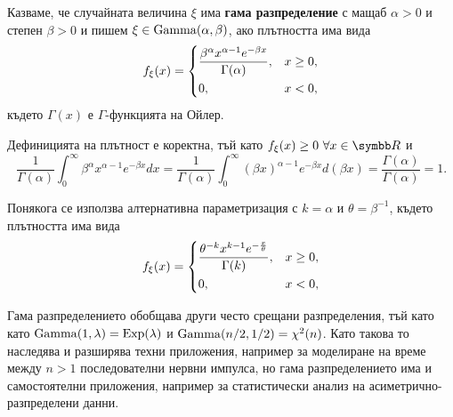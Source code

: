 \documentclass[numbers=endperiod, bibliography=totocnumbered]{scrartcl}
\begin{document}
\begin{definition}
  Казваме, че случайната величина \( \xi \) има \textbf{гама разпределение} с мащаб \( \alpha > 0 \) и степен \( \beta > 0 \) и пишем \( \xi \in \operatorname{Gamma}(\alpha, \beta) \), ако плътността има вида
  \begin{align*}
    f_\xi(x)
    =
    \begin{dcases}
      \frac {\beta^\alpha x^{\alpha-1} e^{-\beta x}} {\Gamma(\alpha)}, &x \geq 0, \\
      0, &x < 0,
    \end{dcases}
  \end{align*}
  където \( \Gamma(x) \) е \( \Gamma \)-функцията на Ойлер.

  Дефиницията на плътност е коректна, тъй като \( f_\xi(x) \geq 0~\forall x \in \R \) и
  \begin{equation*}
    \frac 1 {\Gamma(\alpha)} \int_0^\infty {\beta^\alpha x^{\alpha-1} e^{-\beta x}} dx
    =
    \frac 1 {\Gamma(\alpha)} \int_0^\infty {{(\beta x)}^{\alpha-1} e^{-\beta x}} d(\beta x)
    =
    \frac {\Gamma(\alpha)} {\Gamma(\alpha)}
    =
    1.
  \end{equation*}

  Понякога се използва алтернативна параметризация с \( k = \alpha \) и \( \theta = \beta^{-1} \), където плътността има вида
  \begin{align*}
    f_\xi(x)
    =
    \begin{dcases}
      \frac {\theta^{-k} x^{k-1} e^{-\frac x \theta}} {\Gamma(k)}, &x \geq 0, \\
      0, &x < 0,
    \end{dcases}
  \end{align*}
\end{definition}

Гама разпределението обобщава други често срещани разпределения, тъй като като \( \operatorname{Gamma}(1, \lambda) = \operatorname{Exp}(\lambda) \) и \( \operatorname{Gamma}(n/2, 1/2) = \chi^2(n) \). Като такова то наследява и разширява техни приложения, например за моделиране на време между \( n > 1 \) последователни нервни импулса, но гама разпределението има и самостоятелни приложения, например за статистически анализ на асиметрично-разпределени данни.
\end{document}
